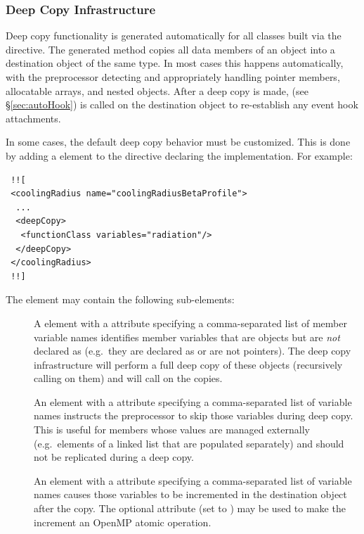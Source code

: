 \subsubsection{Deep Copy Infrastructure}\label{sec:deepCopy}

Deep copy functionality is generated automatically for all classes built via the  directive. The generated  method copies all data members of an object into a destination object of the same type. In most cases this happens automatically, with the preprocessor detecting and appropriately handling pointer members, allocatable arrays, and nested  objects. After a deep copy is made,  (see \S\ref{sec:autoHook}) is called on the destination object to re-establish any event hook attachments.

In some cases, the default deep copy behavior must be customized. This is done by adding a  element to the directive declaring the  implementation. For example:

\begin{verbatim}
 !![
 <coolingRadius name="coolingRadiusBetaProfile">
  ...
  <deepCopy>
   <functionClass variables="radiation"/>
  </deepCopy>
 </coolingRadius>
 !!]
\end{verbatim}

The  element may contain the following sub-elements:
\begin{description}
\item[] A  element with a  attribute specifying a comma-separated list of member variable names identifies member variables that are  objects but are \emph{not} declared as  (e.g.\ they are declared as  or are not pointers). The deep copy infrastructure will perform a full deep copy of these objects (recursively calling  on them) and will call  on the copies.
\item[] An  element with a  attribute specifying a comma-separated list of variable names instructs the preprocessor to skip those variables during deep copy. This is useful for members whose values are managed externally (e.g.\ elements of a linked list that are populated separately) and should not be replicated during a deep copy.
\item[] An  element with a  attribute specifying a comma-separated list of variable names causes those variables to be incremented in the destination object after the copy. The optional  attribute (set to ) may be used to make the increment an OpenMP atomic operation.
\end{description}

